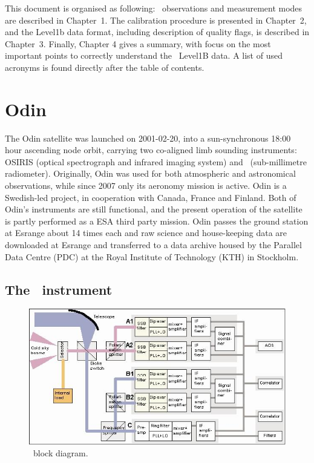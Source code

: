 This document is organised as following:
\smr\ observations and measurement modes are described 
in Chapter~1. The calibration procedure is presented in
Chapter~2, and the Level1b data format, including description
of quality flags, is described in Chapter~3.
Finally,
Chapter 4 gives a summary, with focus on the most important points to correctly
understand the \smr\ Level1B data. A list of used acronyms is found directly after
the table of contents.
   

\section{Odin}

The Odin satellite was launched on 2001-02-20, into a sun-synchronous
18:00 hour ascending node orbit, carrying two co-aligned limb sounding
instruments: OSIRIS (optical spectrograph and infrared imaging system) and
\SMR\ (sub-millimetre radiometer). Originally, Odin was used for both
atmospheric and astronomical observations, while since 2007 only its aeronomy
mission is active. Odin is a Swedish-led project, in cooperation with Canada,
France and Finland. Both of Odin's instruments are still functional, and the
present operation of the satellite is partly performed as a ESA third party
mission.
Odin passes the ground station at Esrange about 14 times each
and raw science and house-keeping data are downloaded at
Esrange and transferred to a data archive housed by the Parallel
Data Centre (PDC) at the Royal Institute of Technology (KTH)
in Stockholm.


\subsection{The \SMR\ instrument}

\begin{figure}[t]
\includegraphics[width=14cm]{Odin_Auto2.jpg}
\caption{\smr\ block diagram.}
\label{fig:blockdiagram}
\end{figure}



